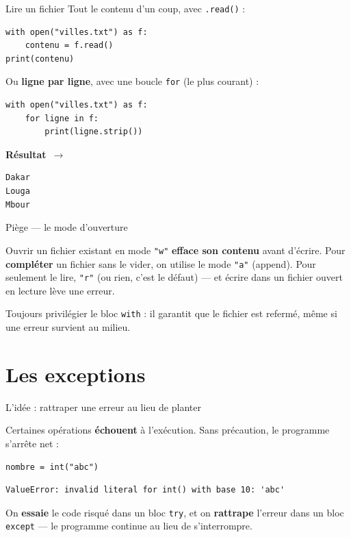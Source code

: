 \documentclass[aspectratio=169,11pt]{beamer}
\newcommand{\resultat}{{\scriptsize\textbf{R\'esultat}~$\rightarrow$}\par\vspace{1pt}}
\begin{document}
\begin{frame}[fragile]{Lire un fichier}
{\small Tout le contenu d'un coup, avec \texttt{.read()} :}
\begin{lstlisting}
with open("villes.txt") as f:
    contenu = f.read()
print(contenu)
\end{lstlisting}
{\small Ou \textbf{ligne par ligne}, avec une boucle \texttt{for} (le plus courant) :}
\begin{lstlisting}
with open("villes.txt") as f:
    for ligne in f:
        print(ligne.strip())
\end{lstlisting}
\resultat
\begin{lstlisting}[style=out]
Dakar
Louga
Mbour
\end{lstlisting}
\end{frame}

\begin{frame}{Piège — le mode d'ouverture}
\begin{ucadpiege}
{\small Ouvrir un fichier existant en mode \texttt{"w"} \textbf{efface son contenu} avant d'écrire. Pour \textbf{compléter} un fichier sans le vider, on utilise le mode \texttt{"a"} (append). Pour seulement le lire, \texttt{"r"} (ou rien, c'est le défaut) — et écrire dans un fichier ouvert en lecture lève une erreur.}
\end{ucadpiege}
{\small Toujours privilégier le bloc \texttt{with} : il garantit que le fichier est refermé, même si une erreur survient au milieu.}
\end{frame}

\section{Les exceptions}

\begin{frame}[fragile]{L'idée : rattraper une erreur au lieu de planter}
\begin{ucaddef}
{\small Certaines opérations \textbf{échouent} à l'exécution. Sans précaution, le programme s'arrête net :}
\end{ucaddef}
\begin{lstlisting}
nombre = int("abc")
\end{lstlisting}
\begin{lstlisting}[style=err]
ValueError: invalid literal for int() with base 10: 'abc'
\end{lstlisting}
{\small On \textbf{essaie} le code risqué dans un bloc \texttt{try}, et on \textbf{rattrape} l'erreur dans un bloc \texttt{except} — le programme continue au lieu de s'interrompre.}
\end{frame}
\end{document}
